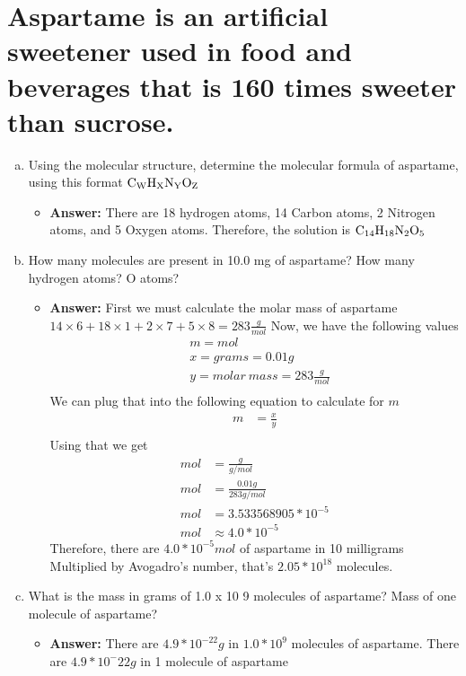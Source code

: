 \documentclass{scrartcl}
\begin{document}
\section{Aspartame is an artificial sweetener used in food and beverages that is 160 times sweeter than sucrose.}
\label{sec:org2203d72}
\begin{enumerate}[(a)]
\item Using the molecular structure, determine the molecular formula of aspartame,
using this format \(\ce{C_{W}H_{X}N_{Y}O_{Z}}\)
\begin{itemize}
\item \textbf{Answer:} There are 18 hydrogen atoms, 14 Carbon atoms, 2 Nitrogen atoms, and 5 Oxygen atoms. Therefore, the solution is \(\ce{C14H18N2O5}\)
\end{itemize}

\item How many molecules are present in 10.0 mg of aspartame? How many hydrogen
atoms? O atoms?

\begin{itemize}
\item \textbf{Answer:} First we must calculate the molar mass of aspartame
\(14\times6+18\times1+2\times7+5\times8=283\frac{g}{mol}\)
Now, we have the following values
    \begin{align*}
    &m=mol\\
    &x=grams=0.01g\\
    &y=molar\ mass=283\frac{g}{mol}\\
\end{align*}
We can plug that into the following equation to calculate for   \(m\)
    \begin{align*}
    m&=\frac{x}{y}\\
\end{align*}
Using that we get
\begin{align*}
mol&=\frac{g}{g/mol}\\
mol&=\frac{0.01g}{283g/mol}\\
mol&=3.533568905*10^{-5}\\
mol&\approx4.0*10^{-5}
\end{align*}
Therefore, there are \(4.0*10^{-5}mol\) of aspartame in 10 milligrams
Multiplied by Avogadro's number, that's \(2.05*10^{18}\) molecules.
\end{itemize}

\item What is the mass in grams of 1.0 x 10 9 molecules of aspartame? Mass of one molecule of aspartame?
\begin{itemize}
\item \textbf{Answer:} There are \(4.9*10^{-22}g\) in \(1.0*10^{9}\) molecules of aspartame. There are \(4.9*10^-22g\) in 1 molecule of aspartame
\end{itemize}
\end{enumerate}
\end{document}
